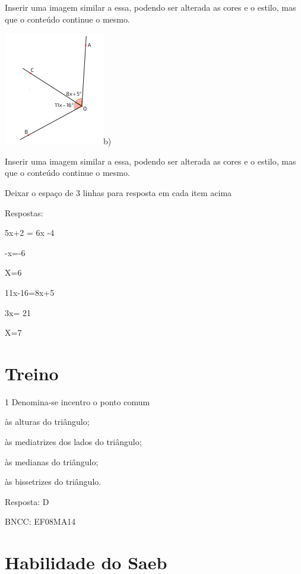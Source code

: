 \item 

Inserir uma imagem similar a essa, podendo ser alterada as cores e o
estilo, mas que o conteúdo continue o mesmo.

\includegraphics[width=1\times 80208in,height=2\times 02917in]{./imgSAEB_8_MAT/media/image34.png}b)

Inserir uma imagem similar a essa, podendo ser alterada as cores e o
estilo, mas que o conteúdo continue o mesmo.

Deixar o espaço de 3 linhas para resposta em cada item acima

Respostas:

\item 

5x+2 = 6x -4

-x=-6

X=6

\item 

11x-16=8x+5

3x= 21

X=7

\section{Treino}

\num{1} Denomina-se incentro o ponto comum

\item às alturas do triângulo;
\item às mediatrizes dos lados do triângulo;
\item às medianas do triângulo;
\item às bissetrizes do triângulo.

Resposta: D

BNCC: EF08MA14

\section{Habilidade do Saeb}

